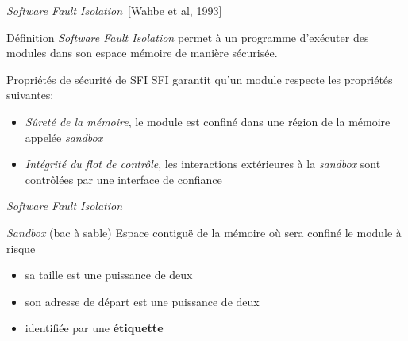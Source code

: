 \documentclass[10pt,usenames,dvipsnames]{beamer}
\begin{document}
\begin{frame}{\textit{Software Fault Isolation}~[Wahbe et al, 1993]}
	\begin{block}{Définition}
		\textit{Software Fault Isolation} permet à un programme d'exécuter des modules dans son espace mémoire de manière sécurisée.\\
	\end{block}
	\begin{block}{Propriétés de sécurité de SFI}
		SFI garantit qu'un module respecte les propriétés suivantes:
		\begin{itemize}
			\item \textit{Sûreté de la mémoire}, le module est confiné dans une région de la mémoire appelée \textit{sandbox}
			\item \textit{Intégrité du flot de contrôle}, les interactions extérieures à la \textit{sandbox} sont contrôlées par une interface de confiance
		\end{itemize}
	\end{block}
\end{frame}

\begin{frame}{\textit{Software Fault Isolation}}
	\begin{block}{\textit{Sandbox} (bac à sable)}
		Espace contigu\"e de la mémoire où sera confiné le module à risque
		\begin{itemize}
			\item sa taille est une puissance de deux
			\item son adresse de départ est une puissance de deux
			\item identifiée par une \textbf{étiquette}
		 \end{itemize}
	\end{block}
\end{frame}
\end{document}
